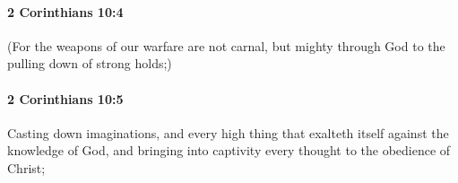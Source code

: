 		\paragraph{2 Corinthians 10:4} %
			\label{2CORINTHIANS-10-4}

			(For the weapons of our warfare are not carnal, but mighty through God to the pulling down of strong holds;)

			\begin{framed}
			\scriptsize
				\begin{compactdesc}
					\item[SBLG] 
				\end{compactdesc}
			\end{framed}

		\paragraph{2 Corinthians 10:5} %
			\label{2CORINTHIANS-10-5}

			Casting down imaginations, and every high thing that exalteth itself against the knowledge of God, and bringing into captivity every thought to the obedience of Christ;

